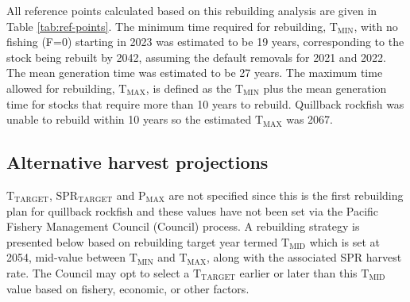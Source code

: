 \documentclass[11pt,
  english,
  a4paper,
]{article}
\begin{document}
\leavevmode\tagmcend\tagstructend\par


All reference points calculated based on this rebuilding analysis are given in Table \ref{tab:ref-points}. The minimum time required for rebuilding, {\(\text{T}_\text{MIN}\)\leavevmode\tagmcend\tagstructend}, with no fishing (F=0) starting in 2023 was estimated to be 19 years, corresponding to the stock being rebuilt by 2042, assuming the default removals for 2021 and 2022. The mean generation time was estimated to be 27 years. The maximum time allowed for rebuilding, {\(\text{T}_\text{MAX}\)\leavevmode\tagmcend\tagstructend}, is defined as the {\(\text{T}_\text{MIN}\)\leavevmode\tagmcend\tagstructend} plus the mean generation time for stocks that require more than 10 years to rebuild. Quillback rockfish was unable to rebuild within 10 years so the estimated {\(\text{T}_\text{MAX}\)\leavevmode\tagmcend\tagstructend} was 2067.

\leavevmode\tagmcend\tagstructend\par


\hypertarget{alternative-harvest-projections}{%
\subsection{Alternative harvest projections}\label{alternative-harvest-projections}}

\leavevmode\tagmcend\tagstructend


{\(\text{T}_\text{TARGET}\)\leavevmode\tagmcend\tagstructend}, {\(\text{SPR}_\text{TARGET}\)\leavevmode\tagmcend\tagstructend} and {\(\text{P}_\text{MAX}\)\leavevmode\tagmcend\tagstructend} are not specified since this is the first rebuilding plan for quillback rockfish and these values have not been set via the Pacific Fishery Management Council (Council) process. A rebuilding strategy is presented below based on rebuilding target year termed {\(\text{T}_\text{MID}\)\leavevmode\tagmcend\tagstructend} which is set at 2054, mid-value between {\(\text{T}_\text{MIN}\)\leavevmode\tagmcend\tagstructend} and {\(\text{T}_\text{MAX}\)\leavevmode\tagmcend\tagstructend}, along with the associated SPR harvest rate. The Council may opt to select a {\(\text{T}_\text{TARGET}\)\leavevmode\tagmcend\tagstructend} earlier or later than this {\(\text{T}_\text{MID}\)\leavevmode\tagmcend\tagstructend} value based on fishery, economic, or other factors.
\end{document}
